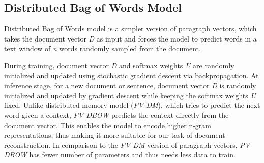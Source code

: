 \documentclass[11pt,a4paper]{article}
\begin{document}








\subsection{Distributed Bag of Words Model}

Distributed Bag of Words model is a simpler version of paragraph vectors, which takes the document vector \textit{D} as input and forces the model to predict words in a text window of  \textit{n} words randomly sampled from the document. 



During training, document vector \textit{D} and softmax weights \textit{U} are randomly initialized and updated using stochastic gradient descent via backpropagation. At inference stage, for a new document or sentence, document vector \textit{D} is randomly initialized and updated by gradient descent while keeping the softmax weights \textit{U} fixed. Unlike distributed memory model (\textit{PV-DM}), which tries to predict the next word given a context, \textit{PV-DBOW} predicts the context directly from the document vector. This enables the model to encode higher n-gram representations, thus making it more suitable for our task of document reconstruction. In comparison to the \textit{PV-DM} version of paragraph vectors, \textit{PV-DBOW} has fewer number of parameters and thus needs less data to train.
\end{document}
